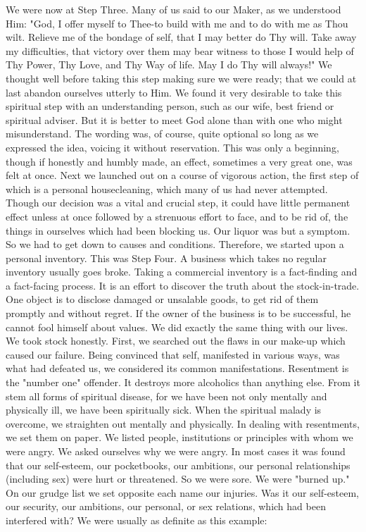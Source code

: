 \begin{biblechapter}
We were now at Step Three.  Many of us said to our Maker, as we understood Him: "God, I offer myself to Thee-to build with me and to do with me as Thou wilt.  Relieve me of the bondage of self, that I may better do Thy will.  Take away my difficulties, that victory over them may bear witness to those I would help of Thy Power, Thy Love, and Thy Way of life.  May I do Thy will always!"  We thought well before taking this step making sure we were ready; that we could at last abandon ourselves utterly to Him.
We found it very desirable to take this spiritual step with an understanding person, such as our wife, best friend or spiritual adviser.  But it is better to meet God alone than with one who might misunderstand.  The wording was, of course, quite optional so long as we expressed the idea, voicing it without reservation.  This was only a beginning, though if honestly and humbly made, an effect, sometimes a very great one, was felt at once.
Next we launched out on a course of vigorous action, the first step of which is a personal housecleaning, which many of us had never attempted.  Though our  decision was a vital and crucial step, it could have little permanent effect unless at once followed by a strenuous effort to face, and to be rid of, the things in ourselves which had been blocking us.  Our liquor was but a symptom.  So we had to get down to causes and conditions.
Therefore, we started upon a personal inventory.  This was Step Four.  A business which takes no regular inventory usually goes broke.  Taking a commercial  inventory is a fact-finding and a fact-facing process.  It is an effort to discover the truth about the stock-in-trade.  One object is to disclose damaged or unsalable goods, to get rid of them promptly and without regret.  If the owner of the business is to be successful, he cannot fool himself about values.
We did exactly the same thing with our lives.  We took stock honestly.  First, we searched out the flaws in our make-up which caused our failure.  Being convinced that self, manifested in various ways, was what had defeated us, we considered its common manifestations.
Resentment is the "number one" offender.  It destroys more alcoholics than anything else.  From it stem all forms of spiritual disease, for we have been not only mentally and physically ill, we have been spiritually sick.  When the spiritual malady is overcome, we straighten out mentally and physically.  In dealing with resentments, we set them on paper.  We listed people, institutions or principles with whom we were angry.  We asked ourselves why we were angry.  In most cases it was found that our self-esteem, our pocketbooks, our ambitions, our personal relationships (including sex) were hurt or threatened.  So we were sore.  We were "burned up."
On our grudge list we set opposite each name our  injuries.  Was it our self-esteem, our security, our ambitions, our personal, or sex relations, which had been  interfered with?
We were usually as definite as this example:


\end{biblechapter}
